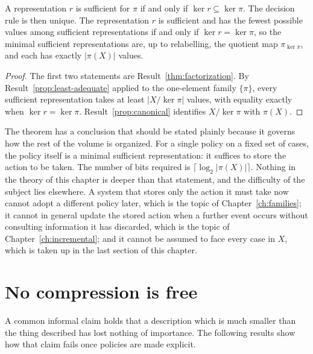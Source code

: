 \begin{established}\label{thm:sufficiency}
A representation $r$ is sufficient for $\pi$ if and only if $\ker r\subseteq\ker\pi$. The decision rule is then unique. The representation $r$ is sufficient and has the fewest possible values among sufficient representations if and only if $\ker r=\ker\pi$, so the minimal sufficient representations are, up to relabelling, the quotient map $\pi_{\ker\pi}$, and each has exactly $|\pi(X)|$ values.
\end{established}
\begin{proof}
The first two statements are Result~\ref{thm:factorization}. By Result~\ref{prop:least-adequate} applied to the one-element family $\{\pi\}$, every sufficient representation takes at least $|X/{\ker\pi}|$ values, with equality exactly when $\ker r=\ker\pi$. Result~\ref{prop:canonical} identifies $X/{\ker\pi}$ with $\pi(X)$.
\end{proof}

The theorem has a conclusion that should be stated plainly because it governs how the rest of the volume is organized. For a single policy on a fixed set of cases, the policy itself is a minimal sufficient representation: it suffices to store the action to be taken. The number of bits required is $\lceil\log_2|\pi(X)|\rceil$. Nothing in the theory of this chapter is deeper than that statement, and the difficulty of the subject lies elsewhere. A system that stores only the action it must take now cannot adopt a different policy later, which is the topic of Chapter~\ref{ch:families}; it cannot in general update the stored action when a further event occurs without consulting information it has discarded, which is the topic of Chapter~\ref{ch:incremental}; and it cannot be assumed to face every case in $X$, which is taken up in the last section of this chapter.

\section{No compression is free}

A common informal claim holds that a description which is much smaller than the thing described has lost nothing of importance. The following results show how that claim fails once policies are made explicit.

